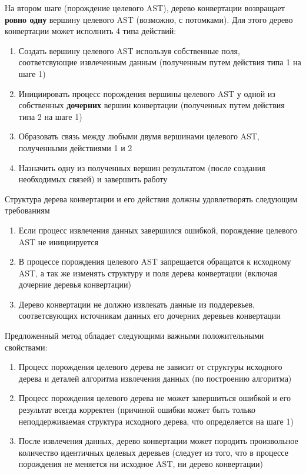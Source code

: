 На втором шаге (порождение целевого AST), дерево конвертации возвращает \textbf{ровно одну} вершину целевого AST (возможно, с потомками). Для этого дерево конвертации может исполнить 4 типа действий:

\begin{enumerate}
    \item Создать вершину целевого AST используя собственные поля, соответсвующие извлеченным данным (полученным путем действия типа 1 на шаге 1)
    \item Инициировать процесс порождения вершины целевого AST у одной из собственных \textbf{дочерних} вершин конвертации (полученных путем действия типа 2 на шаге 1)
    \item Образовать связь между любыми двумя вершинами целевого AST, полученными действиями 1 и 2
    \item Назначить одну из полученных вершин результатом (после создания необходимых связей) и завершить работу
\end{enumerate}

Структура дерева конвертации и его действия должны удовлетворять следующим требованиям
\begin{enumerate}
    \item Если процесс извлечения данных завершился ошибкой, порождение целевого AST не инициируется
    \item В процессе порождения целевого AST запрещается обращатся к исходному AST, а так же изменять структуру и поля дерева конвертации (включая дочерние деревья конвертации)
    \item Дерево конвертации не должно извлекать данные из поддеревьев, соответсвующих источникам данных его дочерних деревьев конвертации
\end{enumerate}

Предложенный метод обладает следующими важными положительными свойствами:
\begin{enumerate}
    \item Процесс порождения целевого дерева не зависит от структуры исходного дерева и деталей алгоритма извлечения данных (по построению алгоритма)
    \item Процесс порождения целевого дерева не может завершиться ошибкой и его результат всегда корректен (причиной ошибки может быть только неподдерживаемая структура исходного дерева, что определяется на шаге 1)
    \item После извлечения данных, дерево конвертации может породить произвольное количество идентичных целевых деревьев (следует из того, что в процессе порождения не меняется ни исходное AST, ни дерево конвертации)
\end{enumerate}

